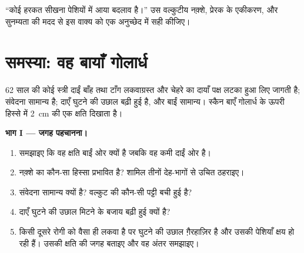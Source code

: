 \begin{exercise}[$\star\star\star$]\label{exo:g12:brain-and-movement:15}
``कोई हरकत सीखना पेशियों में आया बदलाव है।'' उस वल्कुटीय नक़्शे, प्रेरक
 के एकीकरण, और सुनम्यता की मदद से इस वाक्य को एक अनुच्छेद में सही
कीजिए।
\end{exercise}

\section{समस्या: वह बायाँ गोलार्ध}

\begin{problem}
\label{pb:g12:brain-and-movement:1}
62 साल की कोई स्त्री दाईं बाँह तथा टाँग लकवाग्रस्त और चेहरे का दायाँ पक्ष
लटका हुआ लिए जागती है; संवेदना सामान्य है; दाएँ घुटने की उछाल बढ़ी हुई है,
और बाईं सामान्य। स्कैन बाएँ गोलार्ध के ऊपरी हिस्से में \qty{2}{cm} की एक
क्षति दिखाता है।

\medskip
\noindent\textbf{भाग I --- जगह पहचानना।}
\begin{enumerate}
  \item समझाइए कि वह क्षति बाईं ओर क्यों है जबकि वह कमी दाईं ओर है।
  \item नक़्शे का कौन-सा हिस्सा प्रभावित है? शामिल तीनों देह-भागों से उचित
        ठहराइए।
  \item संवेदना सामान्य क्यों है? वल्कुट की कौन-सी पट्टी बची हुई है?
  \item दाएँ घुटने की उछाल मिटने के बजाय बढ़ी हुई क्यों है?
  \item किसी दूसरे रोगी को वैसा ही लकवा है पर घुटने की उछाल ग़ैरहाज़िर है
        और उसकी पेशियाँ क्षय हो रही हैं। उसकी क्षति की जगह बताइए और वह
        अंतर समझाइए।
\end{enumerate}


\end{problem}
